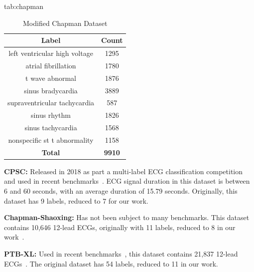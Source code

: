 \documentclass[pmlr,twocolumn]{jmlr}%
\begin{document}
\begin{table}[tbp]
\floatconts
  {tab:chapman}%
  {\caption{Modified Chapman Dataset}}%
  {
    \begin{tabular}{|c|c|}
     \hline
    Label & Count \\
     \hline
    left ventricular high voltage &  1295 \\
    atrial fibrillation           &  1780 \\
    t wave abnormal               &  1876 \\
    sinus bradycardia             &  3889 \\
    supraventricular tachycardia  &   587 \\
    sinus rhythm                  &  1826 \\
    sinus tachycardia             &  1568 \\
    nonspecific st t abnormality  &  1158 \\
     \hline
    \textbf{Total} & \textbf{9910}\\
    \hline
    \end{tabular}
  }
\end{table}

\textbf{CPSC:} Released in 2018 as part a multi-label ECG classification competition~\citep{liu2018open} and used in recent benchmarks~\citep{strodthoff2020deep}. ECG signal duration in this dataset is between 6 and 60 seconds, with an average duration of 15.79 seconds. Originally, this dataset has 9 labels, reduced to 7 for our work.

\textbf{Chapman-Shaoxing:} Has not been subject to many benchmarks. This dataset contains 10,646 12-lead ECGs, originally with 11 labels, reduced to 8 in our work~\citep{zheng202012}.

\textbf{PTB-XL:} Used in recent benchmarks~\citep{strodthoff2020deep}, this dataset contains 21,837 12-lead ECGs~\citep{wagner2020ptb}. The original dataset has 54 labels, reduced to 11 in our work. 
\end{document}
